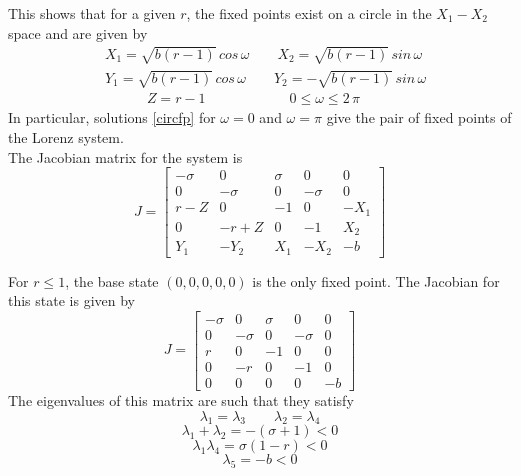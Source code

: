 \documentclass[paper=a4, fontsize=11pt]{scrartcl}
\numberwithin{equation}{section}		%
\numberwithin{figure}{section}			%
\numberwithin{table}{section}				%
\begin{document}
\noindent This shows that for a given $r$, the fixed points exist on a circle in the $X_1 - X_2$ space and are given by
\begin{equation}
	\begin{split}
		& X_1 = \sqrt{b(r-1)} \, cos \, \omega \qquad X_2 = \sqrt{b(r-1)} \, sin \, \omega \\
		& Y_1 = \sqrt{b(r-1)} \, cos \, \omega \qquad Y_2 = - \sqrt{b(r-1)} \, sin \, \omega \\
		& \qquad \quad Z = r - 1 \qquad \qquad \qquad 0 \leq \omega \leq 2 \, \pi
	\end{split} 
	\label{circfp}
\end{equation}
In particular, solutions \ref{circfp} for $\omega = 0$ and $\omega = \pi$ give the pair of fixed points of the Lorenz system.\\

\noindent The Jacobian matrix for the system is 
\begin{equation}
J =
\begin{bmatrix}
	-\sigma & 0 & \sigma & 0 & 0 \\
	0 & -\sigma & 0 & -\sigma & 0 \\
	r - Z & 0 & -1 & 0 & -X_1 \\
	0 & -r + Z & 0 & -1 & X_2 \\
	Y_1 & -Y_2 & X_1 & -X_2 & -b
\end{bmatrix}
\end{equation}

\noindent For $r \leq 1$, the base state $(0,0,0,0,0)$ is the only fixed point. The Jacobian for this state is given by 
\begin{equation}
	J =
	\begin{bmatrix}
		-\sigma & 0 & \sigma & 0 & 0 \\
		0 & -\sigma & 0 & -\sigma & 0 \\
		 r & 0 & -1 & 0 & 0 \\
		0 & - r & 0 & -1 & 0 \\
		0 & 0 & 0 & 0 & -b
	\end{bmatrix}
\end{equation}
The eigenvalues of this matrix are such that they satisfy 
\begin{equation}
	\lambda_1 = \lambda_3 \qquad \lambda_2 = \lambda_4
\end{equation}
\begin{equation}
	\lambda_1 + \lambda_2 = - (\sigma + 1) < 0
\end{equation}
\begin{equation}
	\lambda_1 \lambda_4 = \sigma (1-r) < 0
\end{equation}
\begin{equation}
	\lambda_5 = -b < 0
\end{equation}
\end{document}
